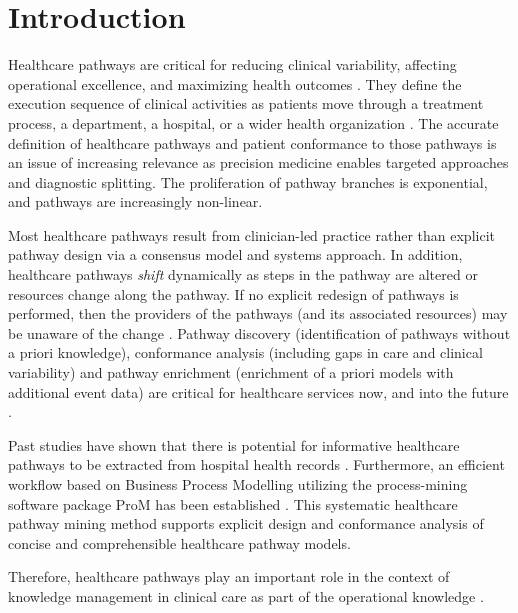 \section{Introduction}
Healthcare pathways are critical for reducing clinical variability,
affecting operational excellence, and maximizing health outcomes
\cite{Lin2001}.
They define the execution sequence of clinical activities as patients
move through a treatment process, a department, a hospital, or a wider
health organization \cite{Huang2016}.
The accurate definition of healthcare pathways and patient conformance
to those pathways is an issue of increasing relevance as precision
medicine enables targeted approaches and diagnostic splitting.
The proliferation of pathway branches is exponential, and pathways are increasingly non-linear. 

Most healthcare pathways result from clinician-led practice rather
than explicit pathway design via a consensus model and systems
approach.
In addition, healthcare pathways \textit{shift} dynamically
as steps in the pathway are altered or resources change along the
pathway.
If no explicit redesign of pathways is performed, then the providers
of the pathways (and its associated resources) may be unaware of the
change \cite{Zhang2015}.
Pathway discovery (identification of pathways without a priori knowledge), conformance analysis (including gaps in care and clinical variability) and pathway enrichment (enrichment of a priori models with additional event data) are critical for healthcare services now, and into the future \cite{Baker2017}.

Past studies have shown that there is potential for informative
healthcare pathways to be extracted from hospital health records
\cite{Iwata2013, Xu2017, Yan2017_pathways}.
Furthermore, an efficient workflow based on
Business Process Modelling utilizing the process-mining software
package ProM \cite{VanDongen2005} has been established
\cite{Mans2015_pathways, Neira2019_pathways}.
This systematic healthcare pathway mining method supports
explicit design and conformance analysis of concise and comprehensible
healthcare pathway models.

Therefore, healthcare pathways play an important role in the context
of knowledge management in clinical care as part of the operational
knowledge \cite{Abidi2007_KM,Haas2016_KM}.


